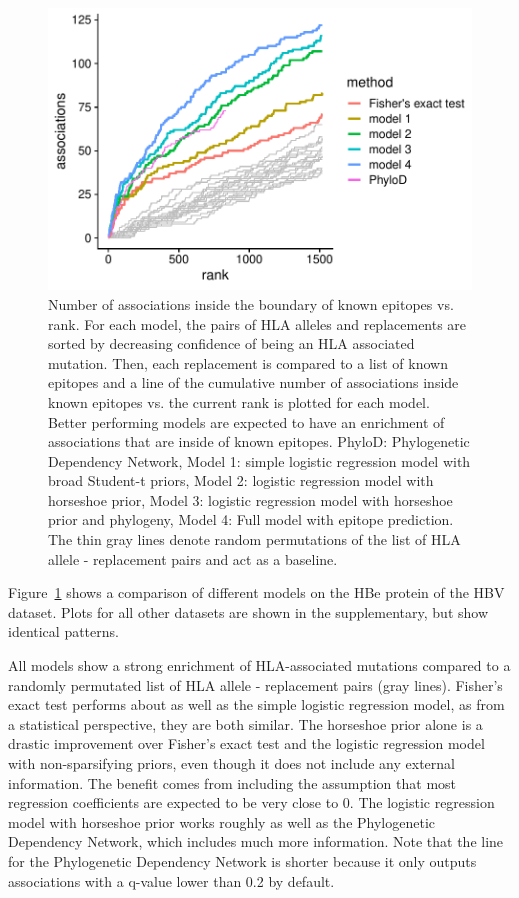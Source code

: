 \documentclass[fleqn,11pt]{SelfArx} %
\begin{document}
\begin{figure}[ht!]
  \includegraphics[width=1\linewidth]{plots/comparison.pdf}
  \caption{Number of associations inside the boundary of known epitopes vs. rank. For each model, the pairs of HLA alleles and replacements are sorted by decreasing confidence of being an HLA associated mutation. Then, each replacement is compared to a list of known epitopes and a line of the cumulative number of associations inside known epitopes vs. the current rank is plotted for each model. Better performing models are expected to have an enrichment of associations that are inside of known epitopes. 
  PhyloD: Phylogenetic Dependency Network, Model 1: simple logistic regression model with broad Student-t priors, Model 2: logistic regression model with horseshoe prior, Model 3: logistic regression model with horseshoe prior and phylogeny, Model 4: Full model with epitope prediction. The thin gray lines denote random permutations of the list of HLA allele - replacement pairs and act as a baseline.}
  \label{fig:comparison}
\end{figure}

Figure~\ref{fig:comparison} shows a comparison of different models on the HBe protein of the HBV dataset. Plots for all other datasets are shown in the supplementary, but show identical patterns.

All models show a strong enrichment of HLA-associated mutations compared to a randomly permutated list of HLA allele - replacement pairs (gray lines). Fisher's exact test performs about as well as the simple logistic regression model, as from a statistical perspective, they are both similar.
The horseshoe prior alone is a drastic improvement over Fisher's exact test and the logistic regression model with non-sparsifying priors, even though it does not include any external information. The benefit comes from including the assumption that most regression coefficients are expected to be very close to 0.
The logistic regression model with horseshoe prior works roughly as well as the Phylogenetic Dependency Network, which includes much more information.
Note that the line for the Phylogenetic Dependency Network is shorter because it only outputs associations with a q-value lower than 0.2 by default.
\end{document}
